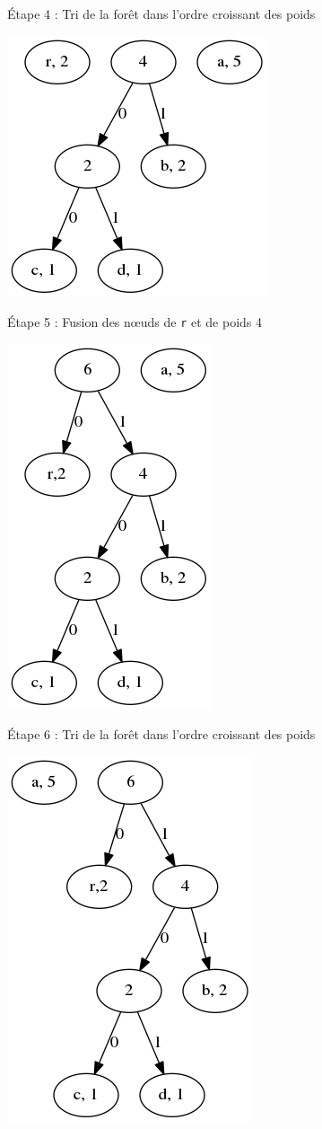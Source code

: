 \documentclass{article}
\begin{document}
\'Etape 4 : Tri de la for\^et dans l'ordre croissant des poids
\begin{center}
\includegraphics[scale=0.3]{HSMI/step4.png} 
\end{center}
\'Etape 5 : Fusion des n{\oe}uds de \texttt{r} et de poids 4
\begin{center}
\includegraphics[scale = 0.3]{HSMI/step5.png} 
\end{center}
\'Etape 6 : Tri de la for\^et dans l'ordre croissant des poids
\begin{center}
\includegraphics[scale = 0.3]{HSMI/step6.png} 
\end{center}
\end{document}
